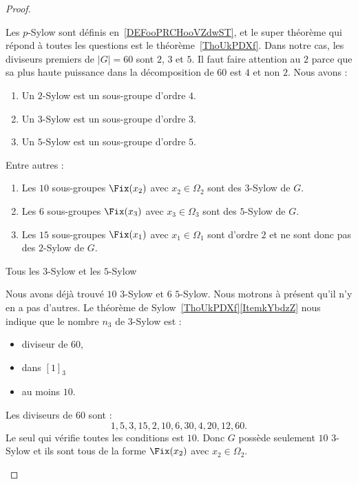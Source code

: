 \begin{proof}
\begin{subproof}
                Les \( p\)-Sylow sont définis en~\ref{DEFooPRCHooVZdwST}, et le super théorème qui répond à toutes les questions est le théorème~\ref{ThoUkPDXf}. Dans notre cas, les diviseurs premiers de \( | G |=60\) sont \( 2\), \( 3\) et \( 5\). Il faut faire attention au $2$ parce que sa plus haute puissance dans la décomposition de \( 60\) est \( 4\) et non \( 2\). Nous avons :
                \begin{enumerate}
                    \item
                        Un \( 2\)-Sylow est un sous-groupe d'ordre \( 4\).
                    \item
                        Un \( 3\)-Sylow est un sous-groupe d'ordre \( 3\).
                    \item
                        Un \( 5\)-Sylow est un sous-groupe d'ordre \( 5\).
                \end{enumerate}
                Entre autres :
                \begin{enumerate}
                    \item
                        Les \( 10\) sous-groupes \( \Fix(x_2)\) avec \( x_2\in \Omega_2\) sont des \( 3\)-Sylow de \( G\).
                    \item
                        Les \( 6\) sous-groupes \( \Fix(x_3)\) avec \( x_3\in \Omega_3\) sont des \( 5\)-Sylow de \( G\).
                    \item
                        Les \( 15\) sous-groupes \( \Fix(x_1)\) avec \( x_1\in \Omega_1\) sont d'ordre $2$ et ne sont donc pas des \( 2\)-Sylow de \( G\).
                \end{enumerate}

            \item[Tous les \( 3\)-Sylow et les \( 5\)-Sylow]

                Nous avons déjà trouvé \( 10\) \( 3\)-Sylow et \( 6\) \( 5\)-Sylow. Nous motrons à présent qu'il n'y en a pas d'autres. Le théorème de Sylow~\ref{ThoUkPDXf}\ref{ItemkYbdzZ} nous indique que le nombre \( n_3\) de \( 3\)-Sylow est :
                \begin{itemize}
                    \item diviseur de \( 60\),
                    \item dans \( [1]_3\)
                    \item au moins \( 10\).
                \end{itemize}
                Les diviseurs de \( 60\) sont :
                \begin{equation}
                    1,5,3,15,2,10,6,30,4,20,12,60.
                \end{equation}
                Le seul qui vérifie toutes les conditions est \( 10\). Donc \( G\) possède seulement \( 10\) \( 3\)-Sylow et ils sont tous de la forme \( \Fix(x_2)\) avec \( x_2\in \Omega_2\).


\end{subproof}
\end{proof}
